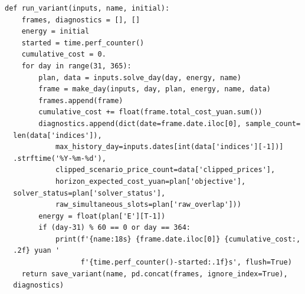 \begin{verbatim}
def run_variant(inputs, name, initial):
    frames, diagnostics = [], []
    energy = initial
    started = time.perf_counter()
    cumulative_cost = 0.
    for day in range(31, 365):
        plan, data = inputs.solve_day(day, energy, name)
        frame = make_day(inputs, day, plan, energy, name, data)
        frames.append(frame)
        cumulative_cost += float(frame.total_cost_yuan.sum())
        diagnostics.append(dict(date=frame.date.iloc[0], sample_count=
  len(data['indices']),
            max_history_day=inputs.dates[int(data['indices'][-1])]
  .strftime('%Y-%m-%d'),
            clipped_scenario_price_count=data['clipped_prices'],
            horizon_expected_cost_yuan=plan['objective'],
  solver_status=plan['solver_status'],
            raw_simultaneous_slots=plan['raw_overlap']))
        energy = float(plan['E'][T-1])
        if (day-31) % 60 == 0 or day == 364:
            print(f'{name:18s} {frame.date.iloc[0]} {cumulative_cost:,
  .2f} yuan '
                  f'{time.perf_counter()-started:.1f}s', flush=True)
    return save_variant(name, pd.concat(frames, ignore_index=True),
  diagnostics)



\end{verbatim}
